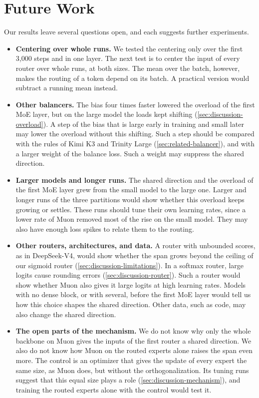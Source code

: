 \section{Future Work}
\label{sec:conclusions-future}
Our results leave several questions open, and each suggests further experiments.
\begin{itemize}
  \item \textbf{Centering over whole runs.} We tested the centering only over the first 3,000 steps and in one layer. The next test is to center the input of every router over whole runs, at both sizes. The mean over the batch, however, makes the routing of a token depend on its batch. A practical version would subtract a running mean instead.
  \item \textbf{Other balancers.} The bias four times faster lowered the overload of the first MoE layer, but on the large model the loads kept shifting (\cref{sec:discussion-overload}). A step of the bias that is large early in training and small later may lower the overload without this shifting. Such a step should be compared with the rules of Kimi K3 and Trinity Large (\cref{sec:related-balancer}), and with a larger weight of the balance loss. Such a weight may suppress the shared direction.
  \item \textbf{Larger models and longer runs.} The shared direction and the overload of the first MoE layer grew from the small model to the large one. Larger and longer runs of the three partitions would show whether this overload keeps growing or settles. These runs should tune their own learning rates, since a lower rate of Muon removed most of the rise on the small model. They may also have enough loss spikes to relate them to the routing.
  \item \textbf{Other routers, architectures, and data.} A router with unbounded scores, as in DeepSeek-V4, would show whether the span grows beyond the ceiling of our sigmoid router (\cref{sec:discussion-limitations}). In a softmax router, large logits cause rounding errors (\cref{sec:discussion-router}). Such a router would show whether Muon also gives it large logits at high learning rates. Models with no dense block, or with several, before the first MoE layer would tell us how this choice shapes the shared direction. Other data, such as code, may also change the shared direction.
  \item \textbf{The open parts of the mechanism.} We do not know why only the whole backbone on Muon gives the inputs of the first router a shared direction. We also do not know how Muon on the routed experts alone raises the span even more. The control is an optimizer that gives the update of every expert the same size, as Muon does, but without the orthogonalization. Its tuning runs suggest that this equal size plays a role (\cref{sec:discussion-mechanism}), and training the routed experts alone with the control would test it.

\end{itemize}
